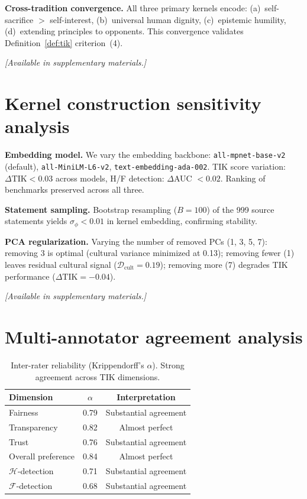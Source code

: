 \documentclass[11pt]{article}
\newcommand{\TIK}{\text{TIK}}
\begin{document}
\textbf{Cross-tradition convergence.} All three primary kernels encode: (a)~self-sacrifice $>$ self-interest, (b)~universal human dignity, (c)~epistemic humility, (d)~extending principles to opponents. This convergence validates Definition~\ref{def:tik} criterion~(4).

\textit{[Available in supplementary materials.]}

\section{Kernel construction sensitivity analysis}
\label{app:kernel-sensitivity}

\textbf{Embedding model.} We vary the embedding backbone: \texttt{all-mpnet-base-v2} (default), \texttt{all-MiniLM-L6-v2}, \texttt{text-embedding-ada-002}. TIK score variation: $\Delta\TIK < 0.03$ across models, H/F detection: $\Delta$AUC $< 0.02$. Ranking of benchmarks preserved across all three.

\textbf{Statement sampling.} Bootstrap resampling ($B=100$) of the 999 source statements yields $\sigma_\phi < 0.01$ in kernel embedding, confirming stability.

\textbf{PCA regularization.} Varying the number of removed PCs (1, 3, 5, 7): removing 3 is optimal (cultural variance minimized at 0.13); removing fewer (1) leaves residual cultural signal ($\mathcal{D}_{\text{cult}}=0.19$); removing more (7) degrades TIK performance ($\Delta\TIK=-0.04$).

\textit{[Available in supplementary materials.]}


\section{Multi-annotator agreement analysis}
\label{app:annotator}

\begin{table}[h]
\centering
\small
\caption{Inter-rater reliability (Krippendorff's $\alpha$). Strong agreement across TIK dimensions.}
\begin{tabular}{lcc}
\toprule
\textbf{Dimension} & $\alpha$ & \textbf{Interpretation} \\
\midrule
Fairness & 0.79 & Substantial agreement \\
Transparency & 0.82 & Almost perfect \\
Trust & 0.76 & Substantial agreement \\
Overall preference & 0.84 & Almost perfect \\
$\mathcal{H}$-detection & 0.71 & Substantial agreement \\
$\mathcal{F}$-detection & 0.68 & Substantial agreement \\
\bottomrule
\end{tabular}
\end{table}
\end{document}
